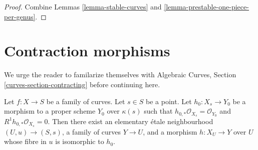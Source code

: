 \begin{proof}
Combine Lemmas \ref{lemma-stable-curves} and
\ref{lemma-prestable-one-piece-per-genus}.
\end{proof}




\section{Contraction morphisms}
\label{section-contracting}

\noindent
We urge the reader to familarize themselves with
Algebraic Curves, Section \ref{curves-section-contracting}
before continuing here.

\begin{lemma}
\label{lemma-contract-basic}
Let $f : X \to S$ be a family of curves. Let $s \in S$ be a point.
Let $h_0 : X_s \to Y_0$ be a morphism to a proper scheme $Y_0$ over $\kappa(s)$
such that $h_{0, *}\mathcal{O}_{X_s} = \mathcal{O}_{Y_0}$ and
$R^1h_{0, *}\mathcal{O}_{X_s} = 0$. Then there exist an elementary
\'etale neighbourhood $(U, u) \to (S, s)$, a family of curves $Y \to U$,
and a morphism $h : X_U \to Y$ over $U$ whose fibre in $u$
is isomorphic to $h_0$.
\end{lemma}

